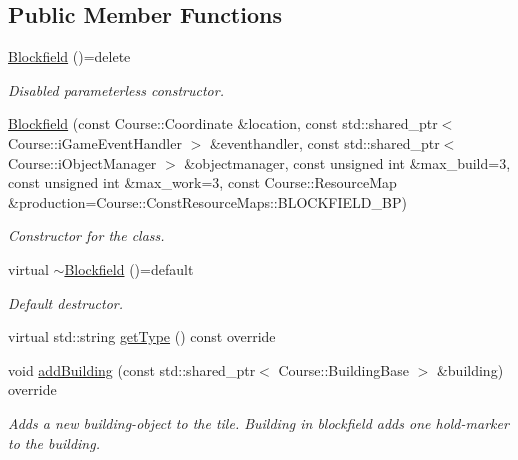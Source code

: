 \subsection*{Public Member Functions}
\begin{DoxyCompactItemize}
\item 
\hypertarget{classBlockfield_ab0afafde05162b073612f1d82577dcd7}{\hyperlink{classBlockfield_ab0afafde05162b073612f1d82577dcd7}{Blockfield} ()=delete}\label{classBlockfield_ab0afafde05162b073612f1d82577dcd7}

\begin{DoxyCompactList}\small\item\em Disabled parameterless constructor. \end{DoxyCompactList}\item 
\hyperlink{classBlockfield_a20a58536a74c2a3c61cde031475f9c60}{Blockfield} (const Course\-::\-Coordinate \&location, const std\-::shared\-\_\-ptr$<$ Course\-::i\-Game\-Event\-Handler $>$ \&eventhandler, const std\-::shared\-\_\-ptr$<$ Course\-::i\-Object\-Manager $>$ \&objectmanager, const unsigned int \&max\-\_\-build=3, const unsigned int \&max\-\_\-work=3, const Course\-::\-Resource\-Map \&production=Course\-::\-Const\-Resource\-Maps\-::\-B\-L\-O\-C\-K\-F\-I\-E\-L\-D\-\_\-\-B\-P)
\begin{DoxyCompactList}\small\item\em Constructor for the class. \end{DoxyCompactList}\item 
\hypertarget{classBlockfield_ac0b5870a27cf92ec11c9fe0dbd5d7778}{virtual \hyperlink{classBlockfield_ac0b5870a27cf92ec11c9fe0dbd5d7778}{$\sim$\-Blockfield} ()=default}\label{classBlockfield_ac0b5870a27cf92ec11c9fe0dbd5d7778}

\begin{DoxyCompactList}\small\item\em Default destructor. \end{DoxyCompactList}\item 
virtual std\-::string \hyperlink{classBlockfield_a5011fa7d10849afb1d0d2a2e0feb4299}{get\-Type} () const override
\item 
void \hyperlink{classBlockfield_a35a23fa64889c708bd228d94394cf18a}{add\-Building} (const std\-::shared\-\_\-ptr$<$ Course\-::\-Building\-Base $>$ \&building) override
\begin{DoxyCompactList}\small\item\em Adds a new building-\/object to the tile. Building in blockfield adds one hold-\/marker to the building. \end{DoxyCompactList}\end{DoxyCompactItemize}


